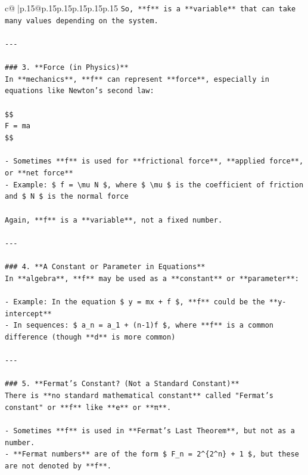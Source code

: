 \documentclass{article}
\begin{document}
{\begin{supertabular}{c@{$\;$}|p{.15\linewidth}@{}p{.15\linewidth}p{.15\linewidth}p{.15\linewidth}p{.15\linewidth}p{.15\linewidth}}
{{{\texttt{So, **f** is a **variable** that can take many values depending on the system.} \\
\\ 
\texttt{{-}{-}{-}} \\
\\ 
\texttt{\#\#\# 3. **Force (in Physics)**} \\
\texttt{In **mechanics**, **f** can represent **force**, especially in equations like Newton’s second law:} \\
\\ 
\texttt{\$\$} \\
\texttt{F = ma} \\
\texttt{\$\$} \\
\\ 
\texttt{{-} Sometimes **f** is used for **frictional force**, **applied force**, or **net force**} \\
\texttt{{-} Example: \$ f = \textbackslash{}mu N \$, where \$ \textbackslash{}mu \$ is the coefficient of friction and \$ N \$ is the normal force} \\
\\ 
\texttt{Again, **f** is a **variable**, not a fixed number.} \\
\\ 
\texttt{{-}{-}{-}} \\
\\ 
\texttt{\#\#\# 4. **A Constant or Parameter in Equations**} \\
\texttt{In **algebra**, **f** may be used as a **constant** or **parameter**:} \\
\\ 
\texttt{{-} Example: In the equation \$ y = mx + f \$, **f** could be the **y{-}intercept**} \\
\texttt{{-} In sequences: \$ a\_n = a\_1 + (n{-}1)f \$, where **f** is a common difference (though **d** is more common)} \\
\\ 
\texttt{{-}{-}{-}} \\
\\ 
\texttt{\#\#\# 5. **Fermat's Constant? (Not a Standard Constant)**} \\
\texttt{There is **no standard mathematical constant** called "Fermat's constant" or **f** like **e** or **π**.} \\
\\ 
\texttt{{-} Sometimes **f** is used in **Fermat's Last Theorem**, but not as a number.} \\
\texttt{{-} **Fermat numbers** are of the form \$ F\_n = 2\^{}\{2\^{}n\} + 1 \$, but these are not denoted by **f**.} \\
}}}
\end{supertabular}}
\end{document}

